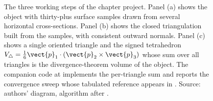 \begin{figure}[p]
  \centering
  
  \caption[Project workflow: surface sample, triangulation, per-triangle
  signed volume.]{The three working steps of the chapter project. Panel
  (a) shows the object with thirty-plus surface samples drawn from
  several horizontal cross-sections. Panel (b) shows the closed
  triangulation built from the samples, with consistent outward
  normals. Panel (c) shows a single oriented triangle and the signed
  tetrahedron $V_{\triangle} = \tfrac{1}{6}\vect{p}_{1}\cdot
  (\vect{p}_{2}\times\vect{p}_{3})$ whose sum over all triangles is
  the divergence-theorem volume of the object. The companion code at
  implements the per-triangle sum and reports the convergence sweep
  whose tabulated reference appears in
  . Source: authors' diagram,
  algorithm after \textcite{paper:v2ch08-zhang-chen-2001}.}
  \label{fig:vol02:ch08:divergence-theorem}
\end{figure}


